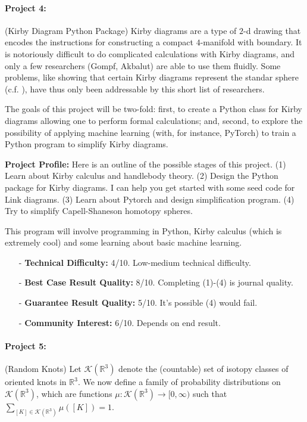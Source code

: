 \documentclass[12pt]{article}
\numberwithin{equation}{section}
\theoremstyle{definition}
\newcommand{\R}{{\mathbb R}}
\begin{document}
\paragraph{Project 4:} (Kirby Diagram Python Package) Kirby diagrams are a type of $2$-d drawing that encodes the instructions for constructing a compact $4$-manifold with boundary. It is notoriously difficult to do complicated calculations with Kirby diagrams, and only a few researchers (Gompf, Akbalut) are able to use them fluidly. Some problems, like showing that certain Kirby diagrams represent the standar sphere (c.f. \cite{a2009}), have thus only been addressable by this short list of researchers.

The goals of this project will be two-fold: first, to create a Python class for Kirby diagrams allowing one to perform formal calculations; and, second, to explore the possibility of applying machine learning (with, for instance, PyTorch) to train a Python program to simplify Kirby diagrams.

{\bf Project Profile:} Here is an outline of the possible stages of this project. (1) Learn about Kirby calculus and handlebody theory. (2) Design the Python package for Kirby diagrams. I can help you get started with some seed code for Link diagrams. (3) Learn about Pytorch and design simplification program. (4) Try to simplify Capell-Shaneson homotopy spheres.

This program will involve programming in Python, Kirby calculus (which is extremely cool) and some learning about basic machine learning.  

\begin{itemize}
	\item[-] {\bf Technical Difficulty:} 4/10. Low-medium technical difficulty.
	\item[-] {\bf Best Case Result Quality:} 8/10. Completing (1)-(4) is journal quality.
	\item[-] {\bf Guarantee Result Quality:} 5/10. It's possible (4) would fail.
	\item[-] {\bf Community Interest:} 6/10. Depends on end result.
\end{itemize}

\paragraph{Project 5:} (Random Knots) Let $\mathcal{K}(\R^3)$ denote the (countable) set of isotopy classes of oriented knots in $\R^3$. We now define a family of probability distributions on $\mathcal{K}(\R^3)$, which are functions $\mu:\mathcal{K}(\R^3) \to [0,\infty)$ such that $\sum_{[K] \in \mathcal{K}(\R^3)} \mu([K]) = 1$.
\end{document}
